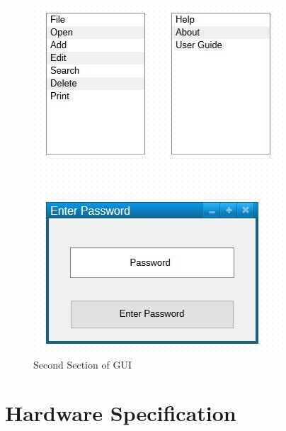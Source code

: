 \begin{figure}[H]
    \includegraphics[width=\textwidth]{GUI_DESIGNS_2.jpg}
    \caption{Second Section of GUI} \label{fig:Second Section of GUI}
\end{figure}

\section{Hardware Specification}

